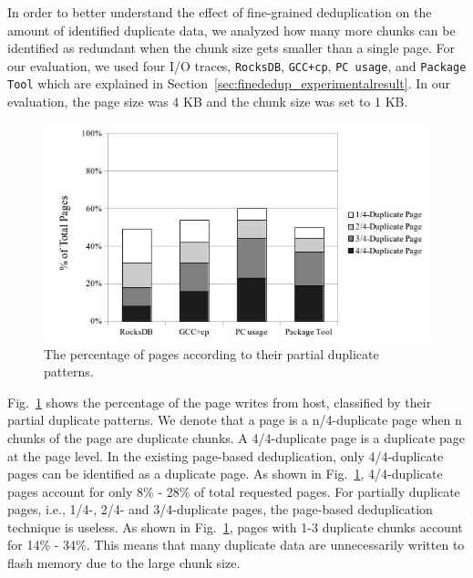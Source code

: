In order to better understand the effect of fine-grained deduplication on the amount of identified duplicate data,
we analyzed how many more chunks can be identified as redundant 
when the chunk size gets smaller than a single page.
For our evaluation, we used four I/O traces, \texttt{RocksDB}, \texttt{GCC+cp}, \texttt{PC usage}, and \texttt{Package Tool} which are 
explained in Section~\ref{sec:finededup_experimentalresult}.
In our evaluation, the page size was 4 KB and the chunk size was set to 1 KB.

\begin{figure}[t]
	\center
	\includegraphics[scale=0.5]{figure/finededup/dupChunkperReq_}
	\caption{The percentage of pages according to their partial duplicate patterns.} %
	\label{fig:percentage}
\end{figure}

Fig.~\ref{fig:percentage} shows the percentage of the page writes from host, classified by their partial duplicate patterns.
We denote that a page is a n/4-duplicate page when n chunks of the page are duplicate chunks.
A 4/4-duplicate page is a duplicate page at the page level.
In the existing page-based deduplication, only 4/4-duplicate pages can be identified as a duplicate page.
As shown in Fig.~\ref{fig:percentage}, 4/4-duplicate pages account for only 8\% - 28\% of total requested pages.
For partially duplicate pages, i.e., 1/4-, 2/4- and 3/4-duplicate pages, the page-based deduplication technique is useless.
As shown in Fig.~\ref{fig:percentage},
pages with 1-3 duplicate chunks account for 14\% - 34\%.
This means that many duplicate data are unnecessarily written to flash memory
due to the large chunk size.

